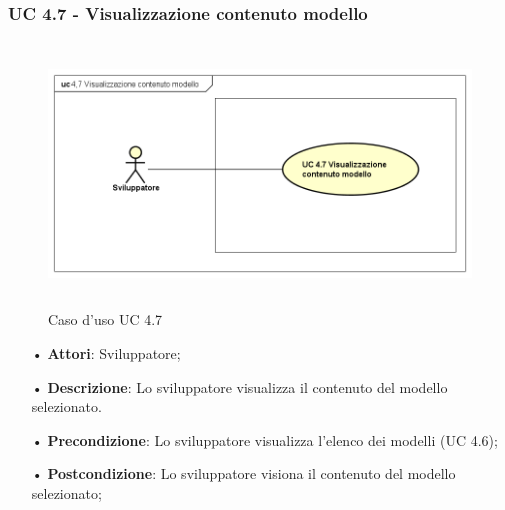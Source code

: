 \subsubsection{UC 4.7 - Visualizzazione contenuto modello} 
\begin{figure}[H]
	\centering
	\includegraphics[width=17cm, height=7cm]{img/UC470.png} 
	\caption{Caso d'uso UC 4.7}\label{fig:470}
	\end{figure}
\begin{itemize}
\item[•]\textbf{Attori}: Sviluppatore;
\item[•]\textbf{Descrizione}: Lo sviluppatore visualizza il contenuto del modello selezionato.
\item[•]\textbf{Precondizione}: Lo sviluppatore visualizza l'elenco dei modelli (UC 4.6);
\item[•]\textbf{Postcondizione}: Lo sviluppatore visiona il contenuto del modello selezionato;
\end{itemize}

